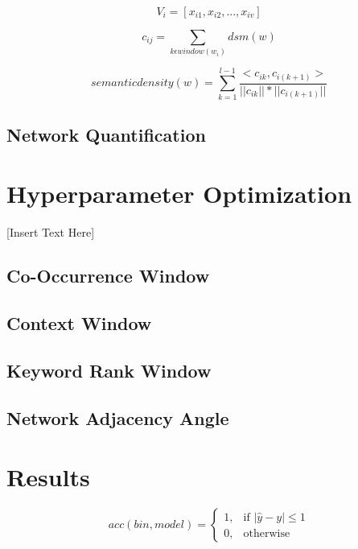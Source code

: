 \documentclass[11pt]{article}
\begin{document}
\begin{equation}
V_{i}=[x_{i1},x_{i2},...,x_{iv}]
\end{equation}

\begin{equation}
c_{ij}=\sum_{k \epsilon window(w_{i})} dsm(w)
\end{equation}

\begin{equation}
semantic density(w) = \sum_{k=1}^{l-1} \frac{<c_{ik},c_{i(k+1)}>}{||c_{ik}||*||c_{i(k+1)}||}
\end{equation}


\subsection{Network Quantification}
\label{sect:network}

\section{Hyperparameter Optimization}
\label{hyper}

[Insert Text Here]

\subsection{Co-Occurrence Window}
\label{cooc window}


\subsection{Context Window}
\label{sect:context window}


\subsection{Keyword Rank Window}
\label{sect:keyword}


\subsection{Network Adjacency Angle}
\label{sect:angle}

\section{Results}
\label{results}


\begin{equation}
acc(bin, model) = 
\begin{cases} 
1, & \text{if } |\hat{y}-y| \leq 1 \\
0, & \text{otherwise}
\end{cases}
\end{equation}
\end{document}
